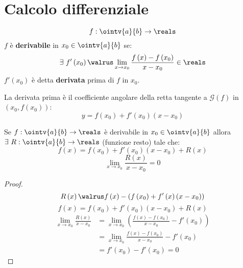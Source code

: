 \section{Calcolo differenziale}

\begin{definition}[Derivata]
  $$f:\ointv{a}{b}\to\reals$$
  $f$ è \textbf{derivabile} in $x_0\in\ointv{a}{b}$ se:
  $$\exists\ f'\left(x_0\right)\walrus\lim_{x\to x_0}\frac{f\left(x\right)-f\left(x_0\right)}{x-x_0}\in\reals$$
  $f'(x_0)$ è detta \textbf{derivata} prima di $f$ in $x_0$.
\end{definition}


\begin{observation}
  La derivata prima è il coefficiente angolare della retta tangente a $\mathcal{G}\left(f\right)$ in $\left(x_0,f\left(x_0\right)\right)$:
  $$y=f\left(x_0\right)+f'\left(x_0\right)\left(x-x_0\right)$$
\end{observation}

\begin{lemma}
  Se $f:\ointv{a}{b}\to\reals$ è derivabile in $x_0\in\ointv{a}{b}$ allora $\exists\ R:\ointv{a}{b}\to\reals$ (funzione resto) tale che:
  $$f\left(x\right)=f\left(x_0\right)+f'\left(x_0\right)\left(x-x_0\right)+R\left(x\right)$$
  $$\lim_{x\to x_0}\frac{R\left(x\right)}{x-x_0}=0$$
\end{lemma}
\begin{proof}
  $$R\left(x\right)\walrus f\left(x\right)-\left(f\left(x_0\right)+f'\left(x\right)\left(x-x_0\right)\right)$$
  $$f\left(x\right)=f\left(x_0\right)+f'\left(x_0\right)\left(x-x_0\right)+R\left(x\right)$$
  \begin{align*}
    \lim_{x\to x_0}\frac{R\left(x\right)}{x-x_0} & =\lim_{x\to x_0}\left(\frac{f\left(x\right)-f\left(x_0\right)}{x-x_0}-f'\left(x_0\right)\right) \\
                                                 & =\lim_{x\to x_0}\frac{f\left(x\right)-f\left(x_0\right)}{x-x_0}-f'\left(x_0\right)              \\
                                                 & =f'\left(x_0\right)-f'\left(x_0\right)=0                                                        
  \end{align*}
\end{proof}

